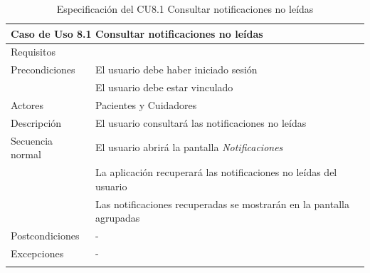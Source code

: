 \begin{longtable}{|p{} p{}|}
    \hline
    \multicolumn{2}{|l|}{\textbf{Caso de Uso 8.1 Consultar notificaciones no leídas}} \\ \hline \hline
    Requisitos          & {req:consultar_notificaciones} \\ \hline
    Precondiciones      & El usuario debe haber iniciado sesión \\
                        & El usuario debe estar vinculado \\ \hline
    Actores             & Pacientes y Cuidadores \\ \hline
    Descripción         & El usuario consultará las notificaciones no leídas \\ \hline
    Secuencia normal    & El usuario abrirá la pantalla \emph{Notificaciones} \\
                        & La aplicación recuperará las notificaciones no leídas del usuario \\
                        & Las notificaciones recuperadas se mostrarán en la pantalla agrupadas \\ \hline
    Postcondiciones     & - \\ \hline
    Excepciones         & - \\ \hline
    \caption{Especificación del CU8.1 Consultar notificaciones no leídas}
    \label{cu:consultar_notificaciones}
\end{longtable}

